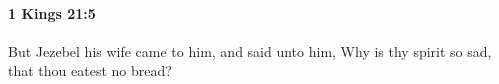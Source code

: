 
		\paragraph{1 Kings 21:5} %
			\label{1KINGS-21-5}

			But Jezebel his wife came to him, and said unto him, Why is thy spirit so sad, that thou eatest no bread?


